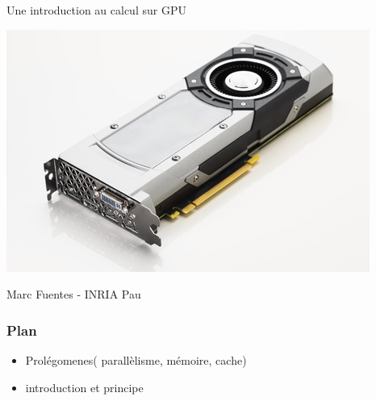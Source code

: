 \documentclass[11pt,mathserif]{beamer}
\begin{document}
\begin{frame}
\begin{center}
{\Large Une introduction au calcul sur GPU} 
\end{center}
\begin{center}
\includegraphics[width=0.5\linewidth]{fig/gpu.jpg}
\end{center}
\begin{center}
{\large Marc Fuentes - INRIA Pau\\ }
\end{center}
\end{frame}


\begin{frame}
\frametitle{Plan}

\begin{itemize}[<+->]
\item Prolégomenes( parallèlisme, mémoire, cache)
\item introduction et principe
\end{itemize}
\end{frame}
\end{document}
